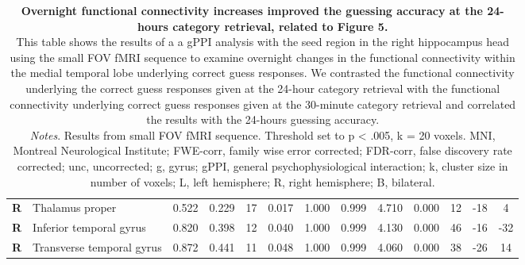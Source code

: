 \begin{landscape}
\begin{table}[!ht]
\begin{tabular}{ll|cccc|cccc|ccc}
        \textbf{R} & Thalamus proper & 0.522 & 0.229 & 17 & 0.017 & 1.000 & 0.999 & 4.710 & 0.000 & 12 & -18 & 4 \\
        \textbf{R} & Inferior temporal gyrus & 0.820 & 0.398 & 12 & 0.040 & 1.000 & 0.999 & 4.130 & 0.000 & 46 & -16 & -32 \\
        \textbf{R} & Transverse temporal gyrus & 0.872 & 0.441 & 11 & 0.048 & 1.000 & 0.999 & 4.060 & 0.000 & 38 & -26 & 14 \\ \hline
    \end{tabular}
    \vspace{1.0 em}
    \caption{\textbf{Overnight functional connectivity increases improved the guessing accuracy at the 24-hours category retrieval, related to Figure 5.} \\ 
    This table shows the results of a a gPPI analysis with the seed region in the right hippocampus head using the small FOV fMRI sequence to examine overnight changes in the functional connectivity within the medial temporal lobe underlying correct guess responses. We contrasted the functional connectivity underlying the correct guess responses given at the 24-hour category retrieval with the functional connectivity underlying correct guess responses given at the 30-minute category retrieval and correlated the results with the 24-hours guessing accuracy. \\
    \vspace{1.0 em} \textit{Notes}. Results from small FOV fMRI sequence. Threshold set to p < .005, k = 20 voxels. MNI, Montreal Neurological Institute; FWE-corr, family wise error corrected; FDR-corr, false discovery rate corrected; unc, uncorrected; g, gyrus; gPPI, general psychophysiological interaction; k, cluster size in number of voxels; L, left hemisphere; R, right hemisphere; B, bilateral.}
\label{tab:gPPI_Day2_vs_Day1_x_Accuracy}
\end{table}
\end{landscape}

